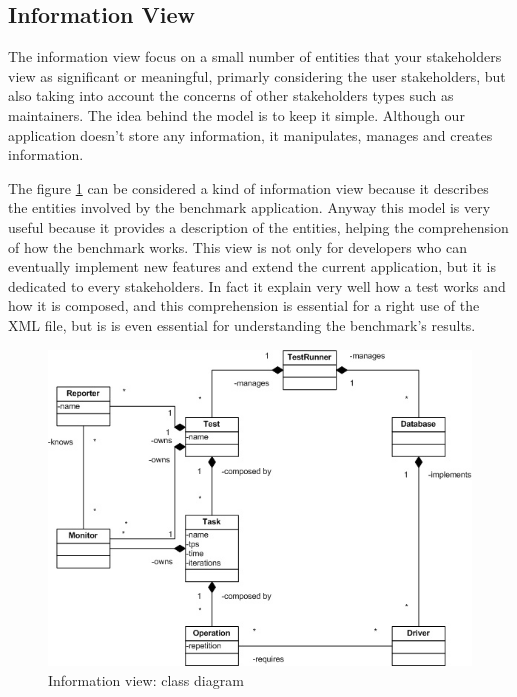 		\subsection{Information View}
The information view focus on a small number of entities that your stakeholders view as significant or meaningful, primarly considering the user stakeholders, but also taking into account the concerns of other stakeholders types such as maintainers. The idea behind the model is to keep it simple. Although our application doesn't store any information, it manipulates, manages and creates information.

The figure \ref{information-view} can be considered a kind of information view because it describes the entities involved by the benchmark application. Anyway this model is very useful because it provides a description of the entities, helping the comprehension of how the benchmark works. This view is not only for developers who can eventually implement new features and extend the current application, but it is dedicated to every stakeholders. In fact it explain very well how a test works and how it is composed, and this comprehension is essential for a right use of the XML file, but is is even essential for understanding the benchmark's results.

\begin{figure}[htp!] 
	\begin{center}
		\includegraphics[width=13cm]{img/uml.jpg}	
	\end{center}
	\caption{Information view: class diagram}
	\label{information-view}	
\end{figure}

